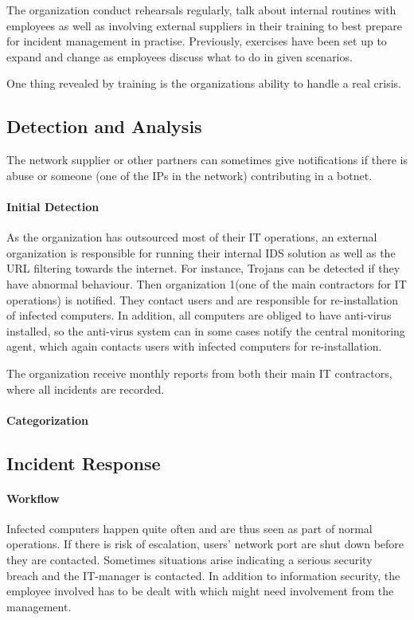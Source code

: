The organization conduct rehearsals regularly, talk about internal routines with employees as well as involving external suppliers in their training to best prepare for incident management in practise. Previously, exercises have been set up to expand and change as employees discuss what to do in given scenarios.

One thing revealed by training is the organizations ability to handle a real crisis. 

\subsection{Detection and Analysis}

The network supplier or other partners can sometimes give notifications if there is abuse or someone (one of the IPs in the network) contributing in a botnet.


\paragraph{Initial Detection}

As the organization has outsourced most of their IT operations, an external organization is responsible for running their internal IDS solution as well as the URL filtering towards the internet. For instance, Trojans can be detected if they have abnormal behaviour. Then organization 1(one of the main contractors for IT operations) is notified. They contact users and are responsible for re-installation of infected computers. In addition, all computers are obliged to have anti-virus installed, so the anti-virus system can in some cases notify the central monitoring agent, which again contacts users with infected computers for re-installation. 

The organization receive monthly reports from both their main IT contractors, where all incidents are recorded. 


\paragraph{Categorization}

\subsection{Incident Response}
\paragraph{Workflow}
Infected computers happen quite often and are thus seen as part of normal operations. If there is risk of escalation, users' network port are shut down before they are contacted. Sometimes situations arise indicating a serious security breach and the IT-manager is contacted. In addition to information security, the employee involved has to be dealt with which might need involvement from the management. 



